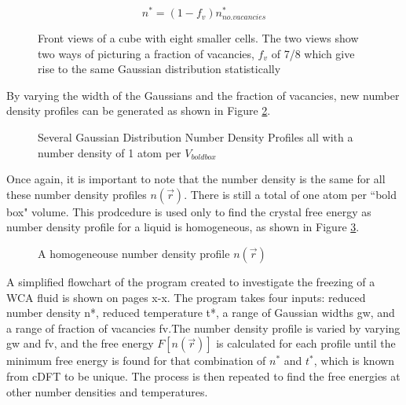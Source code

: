 \documentclass[12pt]{article}
\begin{document}
\begin{displaymath}{ n^* = (1-f_v){n_{no.vacancies}^*}}\end{displaymath} 

\begin{figure}[h!]
    \centering
    \caption{Front views of a cube with eight smaller cells. The two views show two ways of picturing a fraction of vacancies, $f_v$ of 7/8 which give rise to the same Gaussian distribution statistically}
    \label{fig:SameStatPic}
  \end{figure} 

By varying the width of the Gaussians and the fraction of vacancies, new number density profiles can be generated as shown in Figure \ref{fig:Ensemble_vary}.

\begin{figure}[h!]
    \centering
    \caption{Several Gaussian Distribution Number Density Profiles all with a number density of 1 atom per $V_{bold box}$}
    \label{fig:Ensemble_vary}
  \end{figure}  

Once again, it is important to note that the number density is the same for all these number density profiles $n(\vec{r})$. There is still a total of one atom per ``bold box" volume. This prodcedure is used only to find the crystal free energy as number density profile for a liquid is homogeneous, as shown in Figure \ref{fig:homogen_denisty}.  

 \begin{figure}[h!]
    \centering
    \caption{A homogeneouse number density profile $n(\vec{r})$}
    \label{fig:homogen_denisty}
  \end{figure}    
 
A simplified flowchart of the program created to investigate the freezing of a WCA fluid is shown on pages x-x. The program takes four inputs: reduced number density n*, reduced temperature t*, a range of Gaussian widths gw, and a range of fraction of vacancies fv.The number density profile is varied by varying gw and fv, and the free energy $F[n(\vec{r})]$ is calculated for each profile until the minimum free energy is found for that combination of $n^*$ and $t^*$, which is known from cDFT to be unique. The process is then repeated to find the free energies at other number densities and temperatures. 
\end{document}
